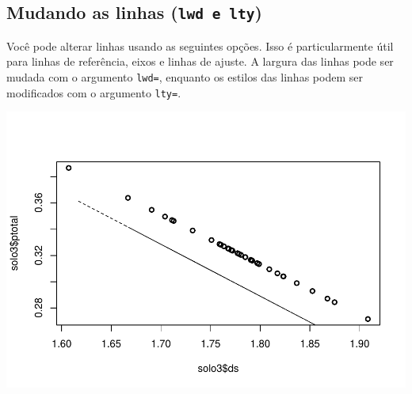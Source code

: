 \documentclass[
]{book}
\newenvironment{Shaded}{\begin{snugshade}}{\end{snugshade}}
\newcommand{\CommentTok}[1]{\textcolor[rgb]{0.56,0.35,0.01}{\textit{#1}}}
\newcommand{\DataTypeTok}[1]{\textcolor[rgb]{0.13,0.29,0.53}{#1}}
\newcommand{\DecValTok}[1]{\textcolor[rgb]{0.00,0.00,0.81}{#1}}
\newcommand{\KeywordTok}[1]{\textcolor[rgb]{0.13,0.29,0.53}{\textbf{#1}}}
\newcommand{\NormalTok}[1]{#1}
\newcommand{\OperatorTok}[1]{\textcolor[rgb]{0.81,0.36,0.00}{\textbf{#1}}}
\begin{document}
\hypertarget{mudando-as-linhas-lwd-e-lty}{%
\subsection{\texorpdfstring{Mudando as linhas (\texttt{lwd\ e\ lty})}{Mudando as linhas (lwd e lty)}}\label{mudando-as-linhas-lwd-e-lty}}

Você pode alterar linhas usando as seguintes opções. Isso é particularmente útil para linhas de referência, eixos e linhas de ajuste. A largura das linhas pode ser mudada com o argumento \texttt{lwd=}, enquanto os estilos das linhas podem ser modificados com o argumento \texttt{lty=}.

\begin{Shaded}
\end{Shaded}

\includegraphics{TudodoR_files/figure-latex/unnamed-chunk-158-1.pdf}

\begin{Shaded}
\end{Shaded}
\end{document}
